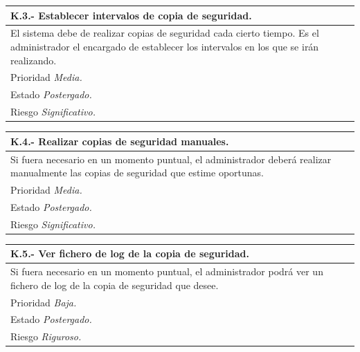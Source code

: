 \documentclass[a4paper,oneside,11pt]{book}
\begin{document}
\begin{center}
\begin{tabulary}{15cm}{|L|}
	\hline
		\bf{K.3.- Establecer intervalos de copia de seguridad.} \\
	\hline
		El sistema debe de realizar copias de seguridad cada cierto tiempo. Es el administrador el encargado de establecer los intervalos en los que se irán realizando. \\
	\hline
		Prioridad \textit{Media.} \\
	\hline
		Estado \textit{Postergado.} \\
	\hline
		Riesgo \textit{Significativo.} \\
	\hline
\end{tabulary}
\end{center}

\begin{center}
\begin{tabulary}{15cm}{|L|}
	\hline
		\bf{K.4.- Realizar copias de seguridad manuales.} \\
	\hline
		Si fuera necesario en un momento puntual, el administrador deberá realizar manualmente las copias de seguridad que estime oportunas. \\
	\hline
		Prioridad \textit{Media.} \\
	\hline
		Estado \textit{Postergado.} \\
	\hline
		Riesgo \textit{Significativo.} \\
	\hline
\end{tabulary}
\end{center}

\begin{center}
\begin{tabulary}{15cm}{|L|}
	\hline
		\bf{K.5.- Ver fichero de log de la copia de seguridad.} \\
	\hline
		Si fuera necesario en un momento puntual, el administrador podrá ver un fichero de log de la copia de seguridad que desee. \\
	\hline
		Prioridad \textit{Baja.} \\
	\hline
		Estado \textit{Postergado.} \\
	\hline
		Riesgo \textit{Riguroso.} \\
	\hline
\end{tabulary}
\end{center}
\end{document}
